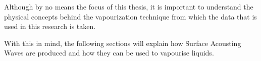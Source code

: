 Although by no means the focus of this thesis, it is important to understand the physical concepts behind the vapourization technique from which the data that is used in this research is taken.

With this in mind, the following sections will explain how Surface Acousting Waves are produced and how they can be used to vapourise liquids.